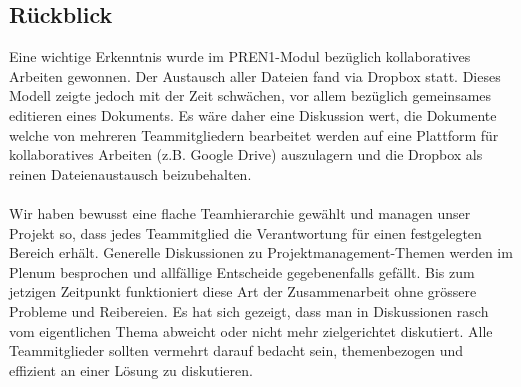 \subsection{Rückblick}
Eine wichtige Erkenntnis wurde im PREN1-Modul bezüglich kollaboratives Arbeiten gewonnen. Der Austausch aller Dateien fand via Dropbox statt. Dieses Modell zeigte jedoch mit der Zeit schwächen, vor allem bezüglich gemeinsames editieren eines Dokuments. Es wäre daher eine Diskussion wert, die Dokumente welche von mehreren Teammitgliedern bearbeitet werden auf eine Plattform für kollaboratives Arbeiten (z.B. Google Drive) auszulagern und die Dropbox als reinen Dateienaustausch beizubehalten.\\
\\
Wir haben bewusst eine flache Teamhierarchie gewählt und managen unser Projekt so, dass jedes Teammitglied die Verantwortung für einen festgelegten Bereich erhält. Generelle Diskussionen zu Projektmanagement-Themen werden im Plenum besprochen und allfällige Entscheide gegebenenfalls gefällt. Bis zum jetzigen Zeitpunkt funktioniert diese Art der Zusammenarbeit ohne grössere Probleme und Reibereien.
Es hat sich gezeigt, dass man in Diskussionen rasch vom eigentlichen Thema abweicht oder nicht mehr zielgerichtet diskutiert. Alle Teammitglieder sollten vermehrt darauf bedacht sein, themenbezogen und effizient an einer Lösung zu diskutieren.

